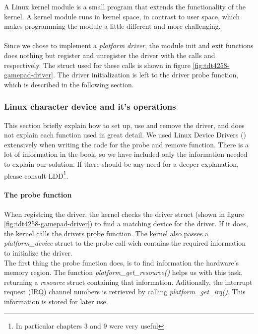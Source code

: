 A Linux kernel module is a small program that extends the functionality of the kernel. A kernel module runs in kernel space, in contrast to user space, which makes programming the module a little different and more challenging.\\
\\
Since we chose to implement a \emph{platform driver}, the module init and exit functions does nothing but register and unregister the driver with the calls  and  respectively. The struct used for these calls is shown in figure \ref{fig:tdt4258-gamepad-driver}. The driver initialization is left to the driver probe function, which is described in the following section. 

\subsubsection{Linux character device and it's operations}

This section briefly explain how to set up, use and remove the driver, and does not explain each function used in great detail. We used Linux Device Drivers (\cite{ldd}) extensively when writing the code for the probe and remove function. There is a lot of information in the book, so we have included only the information needed to explain our solution. If there should be any need for a deeper explanation, please consult LDD\footnote{In particular chapters 3 and 9 were very useful}.   

\paragraph{The probe function}
When registring the driver, the kernel checks the driver struct (shown in figure \ref{fig:tdt4258-gamepad-driver}) to find a matching device for the driver. If it does, the kernel calls the drivers probe function. The kernel also passes a \emph{platform\_device} struct to the probe call wich contains  the required information to initialize the driver.\\

The first thing the probe function does, is to find information the hardware's memory region. The function \emph{platform\_get\_resource()} helps us with this task, returning a \emph{resource} struct containing that information. Aditionally, the interrupt request (IRQ) channel numbers is retrieved by calling \emph{platform\_get\_irq()}. This information is stored for later use. \\

